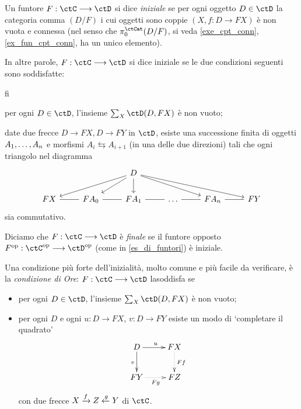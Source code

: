 \begin{definition}\label{def_fun_initfin}
	Un funtore \(F : \ctC\fun\ctD\) si dice \emph{iniziale} se per ogni oggetto \(D\in\ctD\) la categoria comma \((D/F)\) i cui oggetti sono coppie \((X,f : D\to FX)\) è non vuota e connessa (nel senso che \(\pi_0^\ctCat(D/F)\), si veda \ref{exe_cpt_conn}, \ref{ex_fun_cpt_conn}, ha un unico elemento).

	In altre parole, \(F : \ctC\fun\ctD\) si dice iniziale se le due condizioni seguenti sono soddisfatte:
	\begin{enumtag}{fi}
		\item \label{fi_1} per ogni \(D\in\ctD\), l'insieme \(\sum_X\Hom\ctD(D,FX)\) è non vuoto;
		\item \label{fi_2} date due frecce \(D\to FX, D\to FY\) in \(\ctD\), esiste una successione finita di oggetti \(\tup An,\) e morfismi \(A_i \leftrightarrows A_{i+1}\) (in una delle due direzioni) tali che ogni triangolo nel diagramma
		\[\begin{tikzcd}
				&& D \\
				FX & {FA_0} & {FA_1} & \dots & {FA_n} & FY
				\arrow[from=1-3, to=2-1]
				\arrow[from=1-3, to=2-2]
				\arrow[from=1-3, to=2-3]
				\arrow[from=1-3, to=2-5]
				\arrow[from=1-3, to=2-6]
				\arrow[no head, from=2-1, to=2-2]
				\arrow[no head, from=2-2, to=2-3]
				\arrow[no head, from=2-3, to=2-4]
				\arrow[no head, from=2-4, to=2-5]
				\arrow[no head, from=2-5, to=2-6]
			\end{tikzcd}\]
		sia commutativo.
	\end{enumtag}
	Diciamo che \(F : \ctC\fun\ctD\) è \emph{finale} se il funtore opposto \(F^\op : \ctC^\op\fun\ctD^\op\) (come in \ref{es_di_funtori}) è iniziale.
\end{definition}
\begin{remark}\label{condizione_ore}
	Una condizione più forte dell'inizialità, molto comune e più facile da verificare, è la \emph{condizione di Ore}: \(F : \ctC\fun\ctD\) lasoddisfa se
	\begin{itemize}
		\item per ogni \(D\in\ctD\), l'insieme \(\sum_X\Hom\ctD(D,FX)\) è non vuoto;
		\item per ogni \(D\) e ogni \(u : D\to FX\), \(v : D\to FY\) esiste un modo di `completare il quadrato'
		      \[\xymatrix{
				      D\ar[r]^u\ar[d]_v & FX \ar@{.>}[d]^{Ff}\\
				      FY \ar@{.>}[r]_{Fg} & FZ
			      }\]
		      con due frecce \(X \xrightarrow{f}Z \xleftarrow{g} Y\) di \(\ctC\).
	\end{itemize}
\end{remark}
